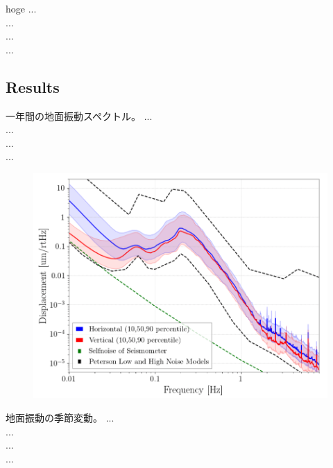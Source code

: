 hoge
...\\
...\\
...\\
...\\

\subsection{Results}
一年間の地面振動スペクトル。
...\\
...\\
...\\
...\\

\begin{figure}[h]
  \begin{center}   
    \includegraphics[width=16.0cm]{./img_chap3/img313.png}
    \caption{}\label{img:img317}
  \end{center}
\end{figure}

地面振動の季節変動。
...\\
...\\
...\\
...\\

